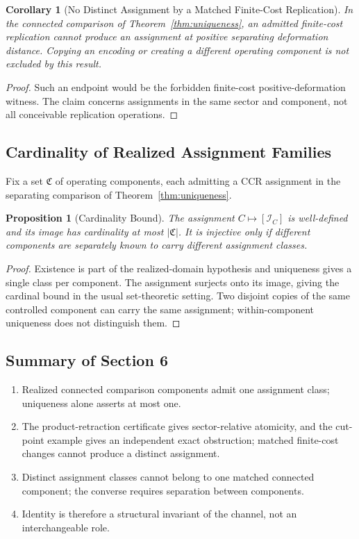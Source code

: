 \documentclass[11pt,a4paper]{article}
\theoremstyle{plain}
\newtheorem{proposition}[theorem]{Proposition}
\newtheorem{corollary}[theorem]{Corollary}
\theoremstyle{definition}
\theoremstyle{remark}
\begin{document}
\begin{corollary}[No Distinct Assignment by a Matched Finite-Cost Replication]\label{cor:nodup}
In the connected comparison of Theorem~\ref{thm:uniqueness}, an admitted finite-cost replication cannot produce an assignment at positive separating deformation distance. Copying an encoding or creating a different operating component is not excluded by this result.
\end{corollary}
\begin{proof}
Such an endpoint would be the forbidden finite-cost positive-deformation witness. The claim concerns assignments in the same sector and component, not all conceivable replication operations.
\end{proof}

\subsection{Cardinality of Realized Assignment Families}
Fix a set $\mathfrak C$ of operating components, each admitting a CCR assignment in the separating comparison of Theorem~\ref{thm:uniqueness}.
\begin{proposition}[Cardinality Bound]\label{prop:cardinality}
The assignment $C\mapsto[\mathcal I_C]$ is well-defined and its image has cardinality at most $|\mathfrak C|$. It is injective only if different components are separately known to carry different assignment classes.
\end{proposition}
\begin{proof}
Existence is part of the realized-domain hypothesis and uniqueness gives a single class per component. The assignment surjects onto its image, giving the cardinal bound in the usual set-theoretic setting. Two disjoint copies of the same controlled component can carry the same assignment; within-component uniqueness does not distinguish them.
\end{proof}

\subsection{Summary of Section 6}

\begin{enumerate}[leftmargin=*]
    \item Realized connected comparison components admit one assignment class; uniqueness alone asserts at most one.
    \item The product-retraction certificate gives sector-relative atomicity, and the cut-point example gives an independent exact obstruction; matched finite-cost changes cannot produce a distinct assignment.
    \item Distinct assignment classes cannot belong to one matched connected component; the converse requires separation between components.
    \item Identity is therefore a structural invariant of the channel, not an interchangeable role.
\end{enumerate}
\end{document}
